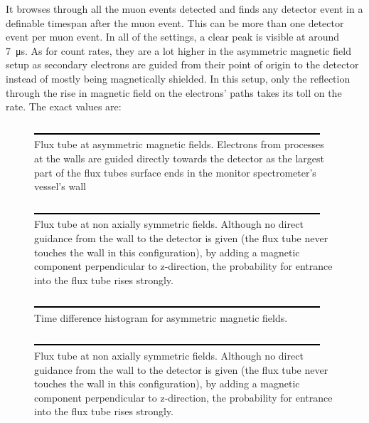   It browses through all the muon events detected and finds any detector event in a definable timespan after the muon event. This can be more than one detector event per  muon event. In all of the settings, a clear peak is visible at around \SI{7}{\micro\second}. As for count rates, they are a lot higher in the asymmetric magnetic field setup as secondary electrons are guided from their point of origin to the detector instead of mostly being magnetically shielded. In this setup, only the reflection through the rise in magnetic field on the electrons' paths takes its toll on the rate.
  The exact values are:
  
  
  \begin{figure}
	\includegraphics{graphics/dummy.eps}
	\caption{Flux tube at asymmetric magnetic fields. Electrons from processes at the walls are guided directly towards the detector as the largest part of the flux tubes surface ends in the monitor spectrometer's vessel's wall}
  	\label{fig:monSpec:asymmetric magnetic field}
  \end{figure}

    \begin{figure}
	
	\includegraphics{graphics/dummy.eps}
  	\caption{Flux tube at non axially symmetric fields. Although no direct guidance from the wall to the detector is given (the flux tube never touches the wall in this configuration), by adding a magnetic component perpendicular to z-direction, the probability for entrance into the flux tube rises strongly.}
  	\label{fig:monSpec:non axially symmetric magnetic field}
  \end{figure}
  
  \begin{figure}
	\label{fig:monSpec:timeDifferences asymmetric magnetic field}
	\caption{Time difference histogram for asymmetric magnetic fields.}
  	\includegraphics{graphics/dummy.eps}
  \end{figure}
  
  \begin{figure}
	\label{fig:monSpec:timeDifferences non axially symmetric magnetic field}
	\caption{Flux tube at non axially symmetric fields. Although no direct guidance from the wall to the detector is given (the flux tube never touches the wall in this configuration), by adding a magnetic component perpendicular to z-direction, the probability for entrance into the flux tube rises strongly.}
  	\includegraphics{graphics/dummy.eps}
  \end{figure}  

